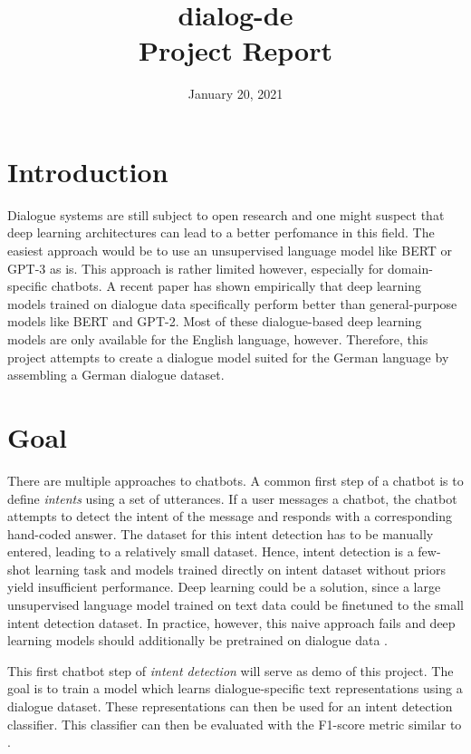\documentclass{article}
\title{dialog-de\\Project Report}
\author{}
\date{January 20, 2021}
\begin{document}
\maketitle

\tableofcontents


\section{Introduction}
Dialogue systems are still subject to open research and one might suspect that
deep learning architectures can lead to a better perfomance in this field. The easiest approach would be to
use an unsupervised language model like BERT or GPT-3 as is. This approach is rather limited however, especially
for domain-specific chatbots. A recent paper \cite{wu-xiong-2020-probing} has shown empirically that deep learning models
trained on dialogue data specifically perform better than general-purpose models like BERT and GPT-2. Most of these dialogue-based deep learning models
are only available for the English language, however. Therefore, this project attempts to create a dialogue model suited
for the German language by assembling a German dialogue dataset.


\section{Goal}
There are multiple approaches to chatbots. A common first step of a chatbot is to define \textit{intents} using a set of
utterances. If a user messages a chatbot, the chatbot attempts to detect the intent of the message and responds with a
corresponding hand-coded answer. The dataset for this intent detection has to be manually entered, leading to a relatively small dataset. Hence, intent detection is a few-shot learning task and models trained directly on intent dataset without priors yield insufficient performance. Deep learning could be a solution, since a large
unsupervised language model trained on text data could be finetuned to the small intent detection dataset. In practice, however, this naive approach fails and deep learning models should additionally be pretrained on dialogue data \cite{wu-xiong-2020-probing}. 

This first chatbot step of \textit{intent detection} will serve as demo of this project. The goal is to train a model which
learns dialogue-specific text representations using a dialogue dataset. These representations can then be used for an
intent detection classifier. This classifier can then be evaluated with the F1-score metric similar to \cite{wu-xiong-2020-probing}.
\end{document}
